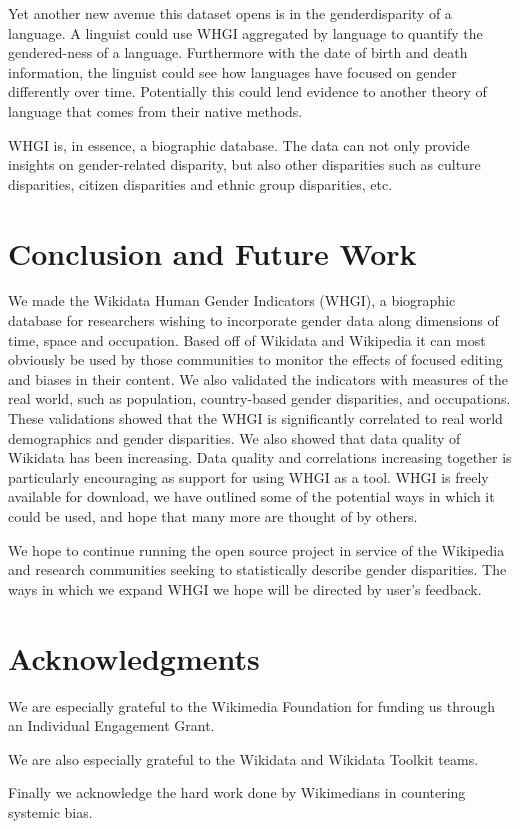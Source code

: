 \documentclass{sig-alternate-05-2015}
\begin{document}
Yet another new avenue this dataset opens is in the gender\-disparity of a language. A linguist could use WHGI aggregated by language to quantify the gendered-ness of a language. Furthermore with the date of birth and death information, the linguist could see how languages have focused on gender differently over time. Potentially this could lend evidence to another theory of language that comes from their native methods. 

WHGI is, in essence, a biographic database. The data can not only provide insights on gender-related disparity, but also other disparities such as culture disparities, citizen disparities and ethnic group disparities, etc.  

\section{Conclusion and Future Work}
We made the Wikidata Human Gender Indicators (WHGI), a biographic database for researchers wishing to incorporate gender data along dimensions of time, space and occupation. Based off of Wikidata and Wikipedia it can most obviously be used by those communities to monitor the effects of focused editing and biases in their content. We also validated the indicators with measures of the real world, such as population, country-based gender disparities, and occupations. These validations showed that the WHGI is significantly correlated to real world demographics and gender disparities. We also showed that data quality of Wikidata has been increasing. Data quality and correlations increasing together is particularly encouraging as support for using WHGI as a tool. WHGI is freely available for download, we have outlined some of the potential ways in which it could be used, and hope that many more are thought of by others.

We hope to continue running the open source project in service of the Wikipedia and research communities seeking to statistically describe gender disparities. The ways in which we expand WHGI we hope will be directed by user's feedback.

\section{ Acknowledgments}
We are especially grateful to the Wikimedia Foundation for funding us through an Individual Engagement Grant. 

We are also especially grateful to the Wikidata and Wikidata Toolkit teams.

Finally we acknowledge the hard work done by Wikimedians in  countering systemic bias.


%

\end{document}
